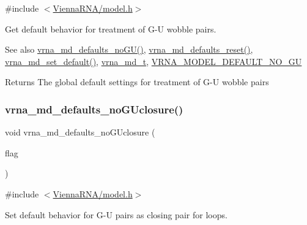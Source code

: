 {\ttfamily \#include $<$\mbox{\hyperlink{model_8h}{Vienna\+R\+N\+A/model.\+h}}$>$}



Get default behavior for treatment of G-\/U wobble pairs. 

\begin{DoxySeeAlso}{See also}
\mbox{\hyperlink{group__model__details_ga98218f85c7a957a1d1ddf4627fdf5a39}{vrna\+\_\+md\+\_\+defaults\+\_\+no\+G\+U()}}, \mbox{\hyperlink{group__model__details_ga70834424cf804d149937de89f80ceb45}{vrna\+\_\+md\+\_\+defaults\+\_\+reset()}}, \mbox{\hyperlink{group__model__details_ga8ac6ff84936282436f822644bf841f66}{vrna\+\_\+md\+\_\+set\+\_\+default()}}, \mbox{\hyperlink{group__model__details_ga1f8a10e12a0a1915f2a4eff0b28ea17c}{vrna\+\_\+md\+\_\+t}}, \mbox{\hyperlink{group__model__details_ga34702f7d14d38b877ba8e475281e97e2}{V\+R\+N\+A\+\_\+\+M\+O\+D\+E\+L\+\_\+\+D\+E\+F\+A\+U\+L\+T\+\_\+\+N\+O\+\_\+\+GU}} 
\end{DoxySeeAlso}
\begin{DoxyReturn}{Returns}
The global default settings for treatment of G-\/U wobble pairs 
\end{DoxyReturn}
\mbox{\label{group__model__details_gade5b9951d71ca2fb357a4e6c0c18ccd1}} 
\subsubsection{\texorpdfstring{vrna\+\_\+md\+\_\+defaults\+\_\+no\+G\+Uclosure()}{vrna\_md\_defaults\_noGUclosure()}}
{\footnotesize\ttfamily void vrna\+\_\+md\+\_\+defaults\+\_\+no\+G\+Uclosure (\begin{DoxyParamCaption}\item[{int}]{flag }\end{DoxyParamCaption})}



{\ttfamily \#include $<$\mbox{\hyperlink{model_8h}{Vienna\+R\+N\+A/model.\+h}}$>$}



Set default behavior for G-\/U pairs as closing pair for loops. 

